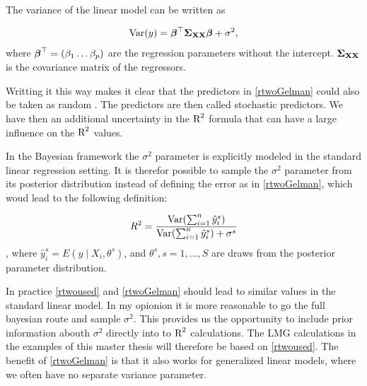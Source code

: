 \documentclass[11pt,a4paper,twoside]{book}\usepackage[]{graphicx}\usepackage[]{color}
\begin{document}
The variance of the linear model can be written as 

      \begin{align} 
        \operatorname{Var}(y) = {\boldsymbol{\beta}}^\top {\boldsymbol{\Sigma}}{}_{{\mathbf{X}} {\mathbf{X}}}  {\boldsymbol{\beta}} + \sigma^2, \label{eq:vary} 
   \end{align}
where ${\boldsymbol{\beta}}^\top = (\beta_{1} \dots \beta_{p})$ are the regression parameters without the intercept.
${\boldsymbol{\Sigma}}{}_{{\mathbf{X}} {\mathbf{X}}}$ is the covariance matrix of the regressors.

Writting it this way makes it clear that the predictors in \eqref{rtwoGelman} could also be taken as random \citep{Gelman2017}. The predictors are then called stochastic predictors. We have then an additional uncertainty in the $\text{R}^2$ formula that can have a large influence on the $\text{R}^2$ values.

In the Bayesian framework the $\sigma^2$ parameter is explicitly modeled in the standard linear regression setting. It is therefor possible to sample the $\sigma^2$ parameter from its posterior distribution instead of defining the error as in \eqref{rtwoGelman}, which woud lead to the following definition:

    \begin{align} 
        R^2 = \frac{\operatorname{Var}(\sum_{i=1}^{n}\hat{y}^s_{i})}{\operatorname{Var}(\sum_{i=1}^{n}\hat{y}^s_{i})+\sigma^s} \label{rtwoused} 
   \end{align} 
 , where $\hat{y}^s_{i}  = E \left({y \mid X_{i}, \theta^s}\right) $,  and $\theta^s, s = 1, ... , S$ are draws from the posterior parameter distribution.
 
In practice \eqref{rtwoused} and \eqref{rtwoGelman} should lead to  similar values in the standard linear model. In my opionion it is more reasonable to go the full bayesian route and sample  $\sigma^2$. This provides us the opportunity to include prior information abouth $\sigma^2$ directly into to $\text{R}^2$ calculations. The LMG calculations in the examples of this master thesis will therefore be based on \eqref{rtwoused}.  The benefit of \eqref{rtwoGelman} is that it also works for generalized linear models, where we often have no separate variance parameter.  
 
\end{document}
